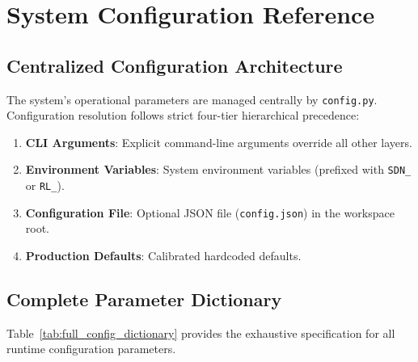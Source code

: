 \chapter{System Configuration Reference}
\label{app:config}

\section{Centralized Configuration Architecture}
The system's operational parameters are managed centrally by \texttt{config.py}. Configuration resolution follows strict four-tier hierarchical precedence:
\begin{enumerate}
    \item \textbf{CLI Arguments}: Explicit command-line arguments override all other layers.
    \item \textbf{Environment Variables}: System environment variables (prefixed with \texttt{SDN\_} or \texttt{RL\_}).
    \item \textbf{Configuration File}: Optional JSON file (\texttt{config.json}) in the workspace root.
    \item \textbf{Production Defaults}: Calibrated hardcoded defaults.
\end{enumerate}

\section{Complete Parameter Dictionary}
Table~\ref{tab:full_config_dictionary} provides the exhaustive specification for all runtime configuration parameters.

